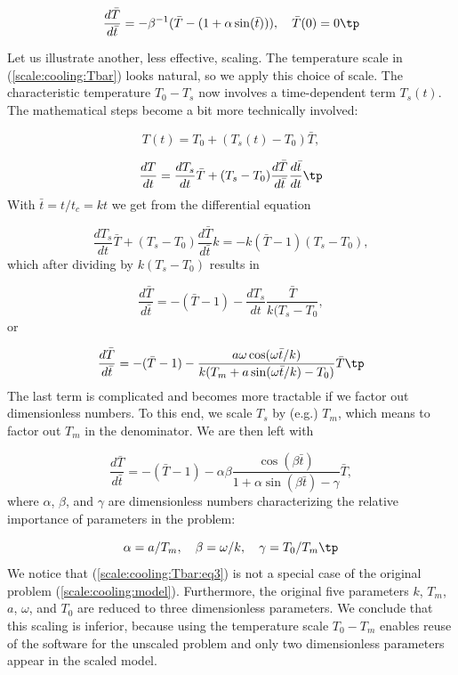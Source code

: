 \documentclass[graybox,envcountchap,sectrefs,final]{svmonodo}
\begin{document}
\begin{equation}
\frac{d\bar T}{d\bar t} = -\beta^{-1}(\bar T - (1 + \alpha\sin (\bar t))),\quad
\bar T(0)=0\tp
\label{scale:cooling:model:scaled2}
\end{equation}


Let us illustrate another, less effective, scaling.
The temperature scale in
(\ref{scale:cooling:Tbar}) looks natural, so we apply this
choice of scale. The characteristic temperature $T_0-T_s$
now involves
a time-dependent term $T_s(t)$. The mathematical steps become a bit
more technically involved:

\[ T(t) = T_0 + (T_s(t)-T_0)\bar T,\]

\[ \frac{dT}{dt} = \frac{dT_s}{dt}\bar T +
(T_s-T_0)\frac{d\bar T}{d\bar t}\frac{d\bar t}{dt}
\tp
\]
With $\bar t = t/t_c = kt$ we get from the differential equation

\[
\frac{dT_s}{dt}\bar T +
(T_s-T_0)\frac{d\bar T}{d\bar t}k
= -k(\bar T - 1)(T_s - T_0),
\]
which after dividing by $k(T_s-T_0)$ results in

\[
\frac{d\bar T}{d\bar t} = -(\bar T - 1) -
\frac{dT_s}{dt}\frac{\bar T}{k(T_s-T_0},
\]
or

\[
\frac{d\bar T}{d\bar t} = -(\bar T - 1) -
\frac{a\omega\cos(\omega \bar t/k)}{k(T_m + a\sin(\omega \bar t/k) -T_0)}\bar T
\tp
\]
The last term is complicated and becomes more tractable if we factor
out dimensionless numbers. To this end, we scale $T_s$ by (e.g.) $T_m$,
which means to factor out $T_m$ in the denominator. We are then
left with

\begin{equation}
\frac{d\bar T}{d\bar t} = -(\bar T - 1) -
\alpha\beta \frac{\cos(\beta \bar t)}{1 + \alpha\sin(\beta\bar t) - \gamma}
\bar T,
\label{scale:cooling:Tbar:eq3}
\end{equation}
where $\alpha$, $\beta$, and $\gamma$ are dimensionless numbers
characterizing the relative importance of parameters in the problem:

\begin{equation}
\alpha=a/T_m,\quad \beta = \omega/k,\quad \gamma = T_0/T_m
\tp
\end{equation}
We notice that (\ref{scale:cooling:Tbar:eq3})
is not a special case of the original problem
(\ref{scale:cooling:model}). Furthermore, the original five
parameters $k$, $T_m$, $a$, $\omega$, and
$T_0$ are reduced to three dimensionless parameters.
We conclude that this scaling is inferior, because
using the temperature scale $T_0-T_m$ enables reuse of the software
for the unscaled problem and only two dimensionless parameters appear
in the scaled model.
\end{document}
